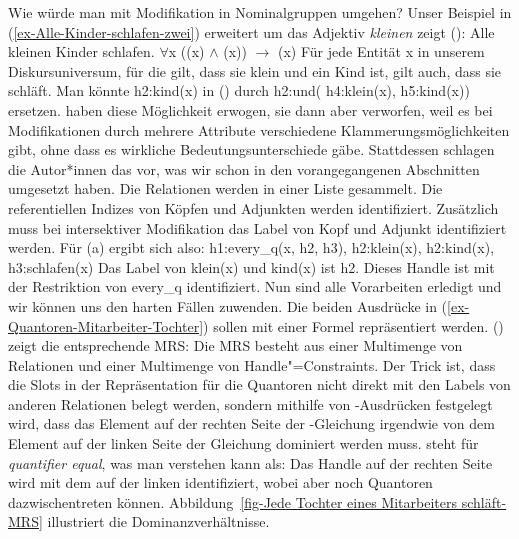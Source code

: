 Wie würde man mit Modifikation in Nominalgruppen umgehen? Unser Beispiel in (\ref{ex-Alle-Kinder-schlafen-zwei}) erweitert um das
Adjektiv \emph{kleinen} zeigt ():
\eal
\ex Alle kleinen Kinder schlafen.
\ex $\forall$x ((x) $\wedge$ (x)) $\to$ (x)
\ex Für jede Entität x in unserem Diskursuniversum, für die gilt, dass sie klein und ein Kind ist, gilt auch,
dass sie schläft.
\zl
Man könnte h2:kind(x) in () durch h2:und( h4:klein(x), h5:kind(x))
ersetzen. \citet[]{CFPS2005a} haben diese Möglichkeit erwogen, sie dann aber verworfen, weil es bei
Modifikationen durch mehrere Attribute verschiedene Klammerungsmöglichkeiten gibt, ohne dass es
wirkliche Bedeutungsunterschiede gäbe. Stattdessen schlagen die Autor*innen das vor, was wir schon
in den vorangegangenen Abschnitten umgesetzt haben. Die Relationen werden in einer Liste
gesammelt. Die referentiellen Indizes von Köpfen und Adjunkten werden identifiziert. Zusätzlich muss
bei intersektiver Modifikation das Label von Kopf und Adjunkt identifiziert werden.
Für (a) ergibt sich also:
\ea
\label{ex-every-klein-kind-schlafen}
h1:every\_q(x, h2, h3), h2:klein(x), h2:kind(x), h3:schlafen(x)
\z
Das Label von klein(x) und kind(x) ist h2. Dieses Handle ist mit der Restriktion von every\_q identifiziert.
\noindent
Nun sind alle Vorarbeiten erledigt und wir können uns den harten Fällen zuwenden. Die beiden
Ausdrücke in (\ref{ex-Quantoren-Mitarbeiter-Tochter}) sollen mit einer Formel repräsentiert
werden. () zeigt die entsprechende MRS:
\ea
\label{ex-Jede Tochter eines Mitarbeiters schläft-MRS}
\z
Die MRS besteht aus einer Multimenge von Relationen und einer Multimenge von Handle"=Constraints.
Der Trick ist, dass die Slots in der Repräsentation für die Quantoren nicht direkt mit den Labels
von anderen Relationen belegt werden, sondern mithilfe von \qeq-Ausdrücken festgelegt wird, dass das
Element auf der rechten Seite der \qeq-Gleichung irgendwie von dem Element auf der linken Seite der
Gleichung dominiert werden muss. \qeq steht für \emph{quantifier equal}, was man verstehen kann als:
Das Handle auf der rechten Seite wird mit dem auf der linken identifiziert, wobei aber noch
Quantoren dazwischentreten können. Abbildung~\ref{fig-Jede Tochter eines Mitarbeiters schläft-MRS}
illustriert die Dominanzverhältnisse.
